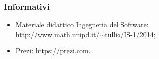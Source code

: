 \subsubsection{Informativi}
\begin{itemize}
	\item Materiale didattico Ingegneria del Software: \\
	\href{http://www.math.unipd.it/~tullio/IS-1/2014}{http://www.math.unipd.it/$\sim$tullio/IS-1/2014};
	
	\item Prezi:
	\href{https://prezi.com}{https://prezi.com}.
\end{itemize}
